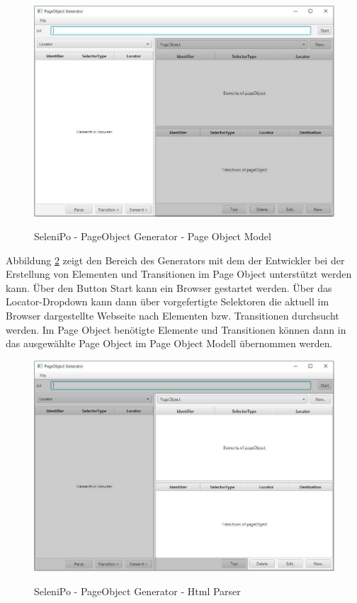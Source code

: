 \begin{figure}[htb]
  \centering  
  \includegraphics[scale=0.5]{img/poGeneratorPo.JPG}\\
  \caption{SeleniPo - PageObject Generator - Page Object Model}
  \label{fig:poGeneratorPo}
\end{figure}

\newpage

Abbildung \ref{fig:poGeneratorHtml} zeigt den Bereich des Generators mit dem der Entwickler bei der Erstellung von Elementen und Transitionen im Page Object unterstützt werden kann.
Über den Button Start kann ein Browser gestartet werden. Über das Locator-Dropdown kann dann über vorgefertigte Selektoren die aktuell im Browser dargestellte Webseite nach Elementen bzw. Transitionen durchsucht werden. Im Page Object benötigte Elemente und Transitionen können dann in das ausgewählte Page Object im Page Object Modell übernommen werden.

\begin{figure}[htb]
  \centering  
  \includegraphics[scale=0.5]{img/poGeneratorHtml.JPG}\\
  \caption{SeleniPo - PageObject Generator - Html Parser}
  \label{fig:poGeneratorHtml}
\end{figure}

